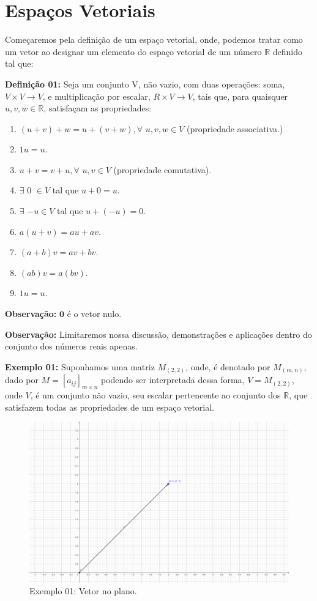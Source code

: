 \chapter{Espaços Vetoriais}
Começaremos pela definição de um espaço vetorial, onde, podemos tratar como um vetor ao designar um elemento do espaço vetorial de um número $\mathbb{R}$ definido tal que:

\noindent\textbf{Definição 01:} Seja um conjunto V, não vazio, com duas operações: soma, $V \times V \rightarrow V$, e multiplicação por escalar, $R \times V \rightarrow V$, tais que, para quaisquer $u, v, w \in \mathbb{R}$, satisfaçam as propriedades: \nocite{boldrini1980}

\begin{enumerate}
	\item $(u + v) + w = u + (v + w), \forall$ $u, v, w \in V$ (propriedade associativa.) 
	\item $1u = u$.
	\item $u + v = v + u, \forall$ $u, v \in V$ (propriedade comutativa).
	\item $\exists$ $0$ $\in V$ tal que $u + 0 = u$.
	\item $\exists$ $-u \in V$ tal que $u + (-u) = 0$.
	\item $a(u + v) = au + av$.
	\item $(a + b)v = av + bv$.
	\item $(ab)v = a(bv)$.
	\item $1u = u$.
\end{enumerate}

\noindent\textbf{Observação:} $\textbf{0}$ é o vetor nulo. \nocite{ulhoa2018}

\noindent\textbf{Observação:} Limitaremos nossa discussão, demonstrações e aplicações dentro do conjunto dos números reais apenas.

\noindent\textbf{Exemplo 01:} Suponhamos uma matriz $M_{(2, 2)}$, onde, é denotado por $M_{(m,n)}$, dado por $M = [a_{ij}]_{m \times n}$ podendo ser interpretada dessa forma, $V = M_{(2, 2)}$, onde $V$, é um conjunto não vazio, seu escalar pertencente ao conjunto dos $\mathbb{R}$, que satisfazem todas as propriedades de um espaço vetorial.

\begin{figure}[H]
	\centering
	\includegraphics[scale=1.0]{exemplo01.png}
	\caption{Exemplo 01: Vetor no plano.}
\end{figure}

